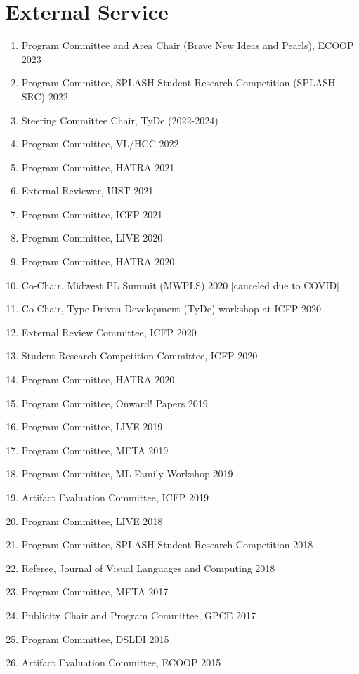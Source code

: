 \documentclass[10pt,letterpaper]{article}
\begin{document}
\section*{External Service}
\begin{enumerate}
  \item Program Committee and Area Chair (Brave New Ideas and Pearls), ECOOP 2023
  \item Program Committee, SPLASH Student Research Competition (SPLASH SRC) 2022
  \item Steering Committee Chair, TyDe (2022-2024)
  \item Program Committee, VL/HCC 2022
  \item Program Committee, HATRA 2021
  \item External Reviewer, UIST 2021
  \item Program Committee, ICFP 2021
  \item Program Committee, LIVE 2020
  \item Program Committee, HATRA 2020
  \item Co-Chair, Midwest PL Summit (MWPLS) 2020 [canceled due to COVID]
  \item Co-Chair, Type-Driven Development (TyDe) workshop at ICFP 2020
  \item External Review Committee, ICFP 2020
  \item Student Research Competition Committee, ICFP 2020
  \item Program Committee, HATRA 2020
  \item Program Committee, Onward! Papers 2019	
  \item Program Committee, LIVE 2019
  \item Program Committee, META 2019
  \item Program Committee, ML Family Workshop 2019
  \item Artifact Evaluation Committee, ICFP 2019
  \item Program Committee, LIVE 2018
  \item Program Committee, SPLASH Student Research Competition 2018
  \item Referee, Journal of Visual Languages and Computing 2018
  \item Program Committee, META 2017
  \item Publicity Chair and Program Committee, GPCE 2017
  \item Program Committee, DSLDI 2015
  \item Artifact Evaluation Committee, ECOOP 2015
\end{enumerate}
\end{document}
